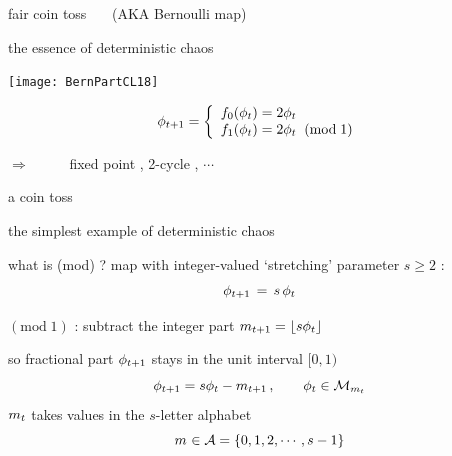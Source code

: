 \begin{frame}{fair coin toss ~~~(AKA  {Bernoulli}  map)}
    \begin{block}{the essence of deterministic chaos}
\begin{center}
            \begin{minipage}[c]{0.36\textwidth}\begin{center}
\texttt{[image: BernPartCL18]}
            \end{center}\end{minipage}
            \hspace{2ex}
            \begin{minipage}[c]{0.46\textwidth}\begin{center}
\[
\ssp_{\zeit+1} =
\left\{ \begin{array}{l} %
        f_0(\ssp_{\zeit}) =  2 \ssp_{\zeit}
                             \\%
        f_1(\ssp_{\zeit}) =  2 \ssp_{\zeit} \;\; (\mbox{mod}\;1)
         \end{array}\right.
\]
            \end{center}\end{minipage}
\end{center}

\hfill $\Rightarrow$~~~~~
fixed point , 2-cycle , $\cdots$
    \end{block}

\bigskip

a 
{coin toss}

\hfill the simplest example of deterministic chaos
\end{frame}

\begin{frame}{what is ({mod}) ?}
map with integer-valued `stretching' parameter $s\geq2$ :
\[
\ssp_{\zeit+1} \,=\, {s}\,\ssp_{\zeit}
\] %

$(\mbox{mod}\;1)$ :
subtract the integer part
\(
\Ssym{\zeit+1}=\left\lfloor{s}\ssp_{\zeit}\right\rfloor
\)

\renewcommand{\ssp}{\ensuremath{\phi}}             %
so fractional part
$\ssp_{\zeit+1}$ stays in the unit interval $[0,1)$
\[
\ssp_{\zeit+1}
= {s} \ssp_{\zeit} - \Ssym{\zeit+1}
\,,\qquad  \ssp_{\zeit}\in\pS_{\Ssym{\zeit}}
\] %
${m_{t}}$ takes values in the ${s}$-letter alphabet
\[
{m_{}} \in \mathcal{A}=\{0,1,2,\cdots,s-1\}
\] %
\end{frame}

